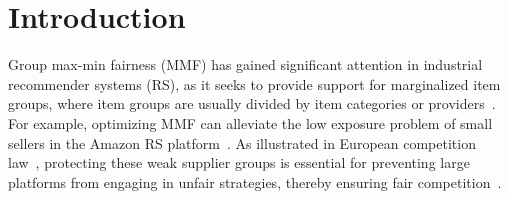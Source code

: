 \section{Introduction}



Group max-min fairness (MMF) has gained significant attention in industrial recommender systems (RS), as it seeks to provide support for marginalized item groups, where item groups are usually divided by item categories or providers~\citep{xu2023p, fairrec, xu2024fairsync}.  
For example, optimizing MMF can alleviate the low exposure problem of small sellers in the Amazon RS platform~\citep{fairrec}.  
As illustrated in European competition law~\citep{jones2014eu}, protecting these weak supplier groups is essential for preventing large platforms from engaging in unfair strategies, thereby ensuring fair competition~\citep{matten2008implicit}. 






